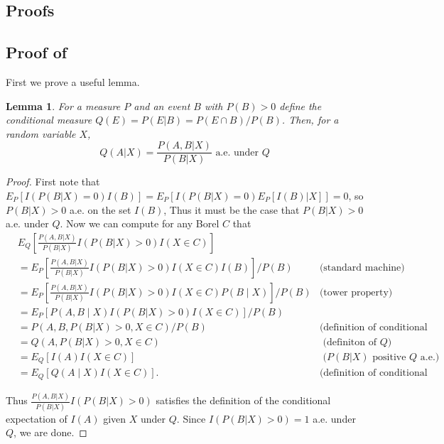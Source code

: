 \documentclass{article}
\newtheorem{lemma}{Lemma}
\begin{document}
\begin{appendix}
\section{Proofs}
\label{sec:proofs_appdx}

\subsection{Proof of }
\label{sec:adjustment_proof}

First we prove a useful lemma.

\begin{lemma}
    \label{lem:ce}
    For a measure $P$ and an event $B$ with $P(B)> 0$ define the conditional measure $Q(E) = P(E| B) = P(E \cap B)/P(B)$. Then, for a random variable $X$, 
    \begin{equation*}
        Q(A | X) = \frac{P(A, B | X) }{ P(B | X) } \text{ a.e. under } Q
    \end{equation*} 
\end{lemma}

\begin{proof}

    First note that $E_P[I( P(B| X) = 0 )  I(B)] = E_P[I( P(B| X) = 0 )  E_P[ I(B) | X] ] = 0$, so $P(B | X) > 0$ a.e. on the set $I(B)$, Thus it must be the case that $P(B | X) > 0 $ a.e. under $Q$. Now we can compute for any Borel $C$ that  
    \begin{align*}
    &E_Q\left[\frac{P(A, B | X) }{ P(B | X) } I(P(B|X) > 0) I(X \in C) \right] \\
    &= E_P\left[\frac{P(A, B | X) }{ P(B | X) } I(P(B| X) > 0) I(X \in C) I(B)\right] / P(B)  & \text{(standard machine)}\\
    &= E_P\left[\frac{P(A, B | X) }{ P(B | X) } I(P(B| X) > 0) I(X \in C) P(B \mid X)\right] / P(B) & \text{(tower property)}  \\
    &= E_P[P(A, B \mid X) I(P(B|X) > 0) I(X \in C)] / P(B) & \\
    &= P(A, B, P(B|X) > 0, X \in C) / P(B) & \text{(definition of conditional expectation)}\\
    &= Q(A, P(B|X) > 0, X \in C) & \text{ (definiton of $Q$)}\\
    &= E_Q[I(A) I(X \in C)] & \text{ ($P(B|X)$ positive $Q$ a.e.)}\\ 
    &= E_Q[Q(A \mid X) I(X \in C)]. & \text{(definition of conditional expectation)}
    \end{align*}

    Thus $\frac{P(A, B | X) }{ P(B | X) } I(P(B|X) > 0)$ satisfies the definition of the conditional expectation of $I(A)$ given $X$ under $Q$. Since $I(P(B|X) > 0) = 1$ a.e. under $Q$, we are done.  


\end{proof}
\end{appendix}
\end{document}

